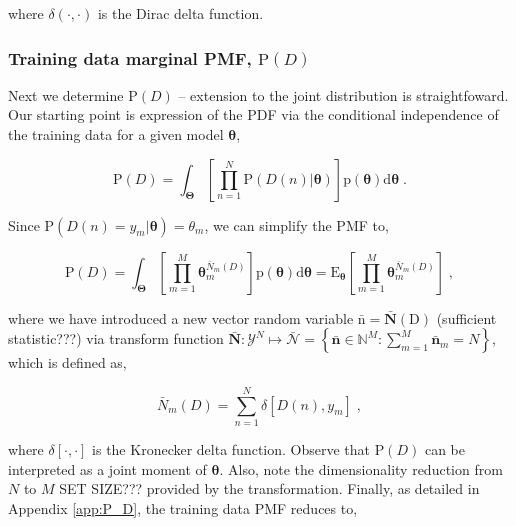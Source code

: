 \documentclass[12pt]{article}
\begin{document}
where $\delta(\cdot,\cdot)$ is the Dirac delta function.


\subsubsection{Training data marginal PMF, $\text{P}(D)$}

Next we determine $\text{P}(D)$ -- extension to the joint distribution is straightfoward. Our starting point is expression of the PDF via the conditional independence of the training data for a given model $\bm{\theta}$,

\begin{equation}
\text{P}(D) = \int_{\bm{\Theta}} \left[ \prod_{n=1}^N \text{P}(D(n) | \bm{\theta}) \right] \text{p}(\bm{\theta}) \mathrm{d}\bm{\theta} \;.
\end{equation}

Since $\text{P}(D(n) = y_m | \bm{\theta}) = \theta_m$, we can simplify the PMF to,

\begin{equation} \label{P_D_int2}
\text{P}(D) = \int_{\bm{\Theta}} \left[ \prod_{m=1}^M \bm{\theta}_m^{\bar{N}_m(D)} \right] \text{p}(\bm{\theta}) \mathrm{d}\bm{\theta} 
= \text{E}_{\bm{\theta}} \left[ \prod_{m=1}^M \bm{\theta}_m^{\bar{N}_m(D)} \right] \;,
\end{equation}

where we have introduced a new vector random variable $\bar{\bm{\mathrm{n}}} = \bar{\bm{N}}(\mathrm{D})$ (sufficient statistic???) via transform function $\bar{\bm{N}}: \mathcal{Y}^N \mapsto \bar{\mathcal{N}} = \left\{ \bar{\bm{n}} \in \mathbb{N}^M: \sum_{m=1}^M \bar{\bm{n}}_m = N \right\}$, which is defined as,


\begin{equation}
\bar{N}_m(D) = \sum_{n=1}^N \delta[D(n),y_m] \;,
\end{equation}

where $\delta[\cdot,\cdot]$ is the Kronecker delta function. Observe that $\text{P}(D)$ can be interpreted as a joint moment of $\bm{\theta}$. Also, note the dimensionality reduction from $N$ to $M$ SET SIZE??? provided by the transformation. Finally, as detailed in Appendix \ref{app:P_D}, the training data PMF reduces to,
\end{document}
